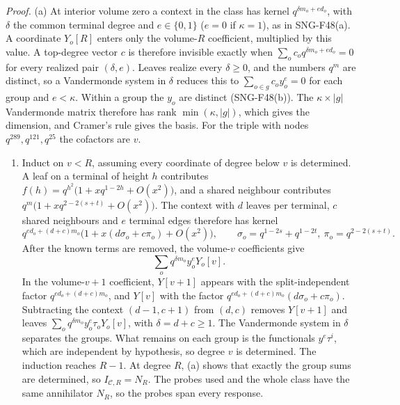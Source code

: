 \documentclass[
  11pt,
  a4paper,
]{report}
\providecommand{\tightlist}{%
  \setlength{\itemsep}{0pt}\setlength{\parskip}{0pt}}
\begin{document}
\emph{Proof.} (a) At interior volume zero a context in the class has
kernel \(q^{\delta m_o+ed_o}\), with \(\delta\) the common terminal
degree and \(e\in\{0,1\}\) (\(e=0\) if \(\kappa=1\)), as in SNG-F48(a).
A coordinate \(Y_o[R]\) enters only the volume-\(R\) coefficient,
multiplied by this value. A top-degree vector \(c\) is therefore
invisible exactly when \(\sum_oc_oq^{\delta m_o+ed_o}=0\) for every
realized pair \((\delta,e)\). Leaves realize every \(\delta\ge0\), and
the numbers \(q^m\) are distinct, so a Vandermonde system in \(\delta\)
reduces this to \(\sum_{o\in g}c_oy_o^e=0\) for each group and
\(e<\kappa\). Within a group the \(y_o\) are distinct (SNG-F48(b)). The
\(\kappa\times|g|\) Vandermonde matrix therefore has rank
\(\min(\kappa,|g|)\), which gives the dimension, and Cramer's rule gives
the basis. For the triple with nodes \(q^{289},q^{121},q^{25}\) the
cofactors are \(v\).

\begin{enumerate}
\def\labelenumi{(\alph{enumi})}
\setcounter{enumi}{1}
\tightlist
\item
  Induct on \(v<R\), assuming every coordinate of degree below \(v\) is
  determined. A leaf on a terminal of height \(h\) contributes
  \(f(h)=q^{h^2}\bigl(1+xq^{1-2h}+O(x^2)\bigr)\), and a shared neighbour
  contributes \(q^{m}\bigl(1+xq^{2-2(s+t)}+O(x^2)\bigr)\). The context
  with \(d\) leaves per terminal, \(c\) shared neighbours and \(e\)
  terminal edges therefore has kernel \[
  q^{ed_o+(d+c)m_o}\bigl(1+x(d\sigma_o+c\pi_o)+O(x^2)\bigr),\qquad \sigma_o=q^{1-2s}+q^{1-2t},\ \pi_o=q^{2-2(s+t)}.
  \] After the known terms are removed, the volume-\(v\) coefficients
  give \[
  \sum_oq^{\delta m_o}y_o^eY_o[v].
  \] In the volume-\(v+1\) coefficient, \(Y[v+1]\) appears with the
  split-independent factor \(q^{ed_o+(d+c)m_o}\), and \(Y[v]\) with the
  factor \(q^{ed_o+(d+c)m_o}(d\sigma_o+c\pi_o)\). Subtracting the
  context \((d-1,c+1)\) from \((d,c)\) removes \(Y[v+1]\) and leaves
  \(\sum_oq^{\delta m_o}y_o^e\tau_oY_o[v]\), with \(\delta=d+c\ge1\).
  The Vandermonde system in \(\delta\) separates the groups. What
  remains on each group is the functionals \(y^e\tau^i\), which are
  independent by hypothesis, so degree \(v\) is determined. The
  induction reaches \(R-1\). At degree \(R\), (a) shows that exactly the
  group sums are determined, so \(I_{\mathcal C,R}=N_R\). The probes
  used and the whole class have the same annihilator \(N_R\), so the
  probes span every response.
\end{enumerate}
\end{document}
